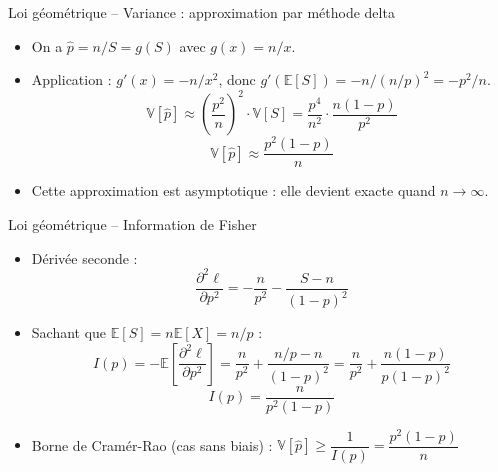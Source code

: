 \documentclass[11pt,aspectratio=169]{beamer}
\begin{document}
\begin{frame}{Loi géométrique -- Variance : approximation par méthode delta}

\begin{itemize}

\item On a $\hat{p} = n/S = g(S)$ avec $g(x) = n/x$.\newline

\item Application : $g'(x) = -n/x^2$, donc $g'(\mathbb{E}[S]) = -n/(n/p)^2 = -p^2/n$.
  \[
  \mathbb{V}[\hat{p}] \approx \left(\frac{p^2}{n}\right)^2 \cdot \mathbb{V}[S] = \frac{p^4}{n^2} \cdot \frac{n(1-p)}{p^2}
  \]
  \[
  \boxed{\mathbb{V}[\hat{p}] \approx \frac{p^2(1-p)}{n}}
  \]

\item Cette approximation est asymptotique : elle devient exacte quand $n \to \infty$.\newline

\end{itemize}

\end{frame}


\begin{frame}{Loi géométrique -- Information de Fisher}

\begin{itemize}

\item Dérivée seconde :
  \[
  \frac{\partial^2 \ell}{\partial p^2} = -\frac{n}{p^2} - \frac{S - n}{(1-p)^2}
  \]

\item Sachant que $\mathbb{E}[S] = n\mathbb{E}[X] = n/p$ :
  \[
  I(p) = -\mathbb{E}\left[\frac{\partial^2 \ell}{\partial p^2}\right] = \frac{n}{p^2} + \frac{n/p - n}{(1-p)^2} = \frac{n}{p^2} + \frac{n(1-p)}{p(1-p)^2}
  \]
  \[
  \boxed{I(p) = \frac{n}{p^2(1-p)}}
  \]

\item Borne de Cramér-Rao (cas sans biais) : $\mathbb{V}[\hat{p}] \geq \dfrac{1}{I(p)} = \dfrac{p^2(1-p)}{n}$

\end{itemize}

\end{frame}
\end{document}
